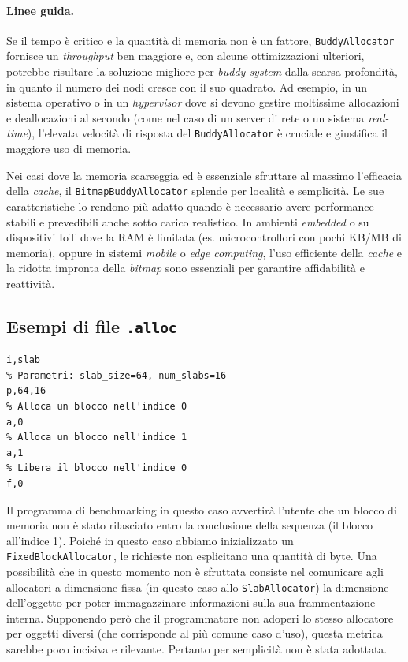 \paragraph{Linee guida.}
Se il tempo è critico e la quantità di memoria non è un fattore, \texttt{BuddyAllocator} fornisce un \textit{throughput} ben maggiore e, con alcune ottimizzazioni ulteriori, potrebbe risultare la soluzione migliore per \textit{buddy system}
 dalla scarsa profondità, in quanto il numero dei nodi cresce con il suo quadrato. 
Ad esempio, in un sistema operativo o in un \textit{hypervisor} dove si devono gestire moltissime allocazioni e deallocazioni al secondo (come nel caso di un server di rete o un sistema \textit{real-time}), l'elevata velocità di risposta del \texttt{BuddyAllocator} è cruciale e giustifica il maggiore uso di memoria.

Nei casi dove la memoria scarseggia ed è essenziale sfruttare al massimo l'efficacia della \textit{cache}, il \texttt{BitmapBuddyAllocator} splende per località e semplicità. Le sue caratteristiche lo rendono più adatto quando è necessario avere performance stabili e prevedibili anche sotto carico realistico.
In ambienti \textit{embedded} o su dispositivi IoT dove la RAM è limitata (es. microcontrollori con pochi KB/MB di memoria), oppure in sistemi \textit{mobile} o \textit{edge computing}, l'uso efficiente della \textit{cache} e la ridotta impronta della \textit{bitmap} sono essenziali per garantire affidabilità e reattività.

\pagebreak

\subsection{Esempi di file \texttt{.alloc}}
\begin{lstlisting}[language={}]
% Tipo di allocatore (Slab)
i,slab         
% Parametri: slab_size=64, num_slabs=16
p,64,16        
% Alloca un blocco nell'indice 0
a,0            
% Alloca un blocco nell'indice 1
a,1            
% Libera il blocco nell'indice 0
f,0      
\end{lstlisting}      

Il programma di benchmarking in questo caso avvertirà l'utente che un blocco di memoria non è stato rilasciato entro la conclusione della sequenza (il blocco all'indice 1). Poiché in questo caso abbiamo inizializzato un \texttt{FixedBlockAllocator}, le richieste non esplicitano una quantità di byte. Una possibilità che in questo momento non è sfruttata consiste nel comunicare agli allocatori a dimensione fissa (in questo caso allo \texttt{SlabAllocator}) la dimensione dell'oggetto per poter immagazzinare informazioni sulla sua frammentazione interna. Supponendo però che il programmatore non adoperi lo stesso allocatore per oggetti diversi (che corrisponde al più comune caso d'uso), questa metrica sarebbe poco incisiva e rilevante. Pertanto per semplicità non è stata adottata.

